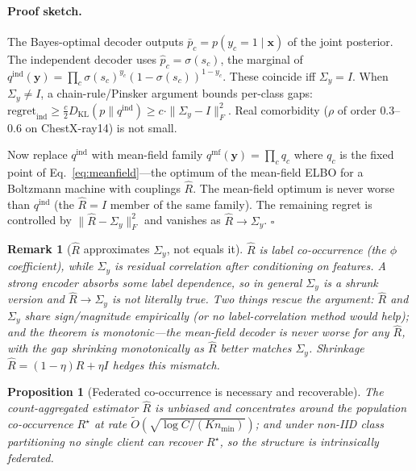\documentclass[10pt,twocolumn,letterpaper]{article}
\newtheorem{proposition}{Proposition}
\newtheorem{remark}{Remark}
\theoremstyle{definition}
\newcommand{\Rhat}{\widehat{R}}
\newcommand{\Sigmay}{\Sigma_{y}}
\begin{document}
\paragraph{Proof sketch.} The Bayes-optimal decoder outputs $\bar p_c{=}p(y_c{=}1{\mid}\mathbf{x})$ of the joint posterior. The independent decoder uses $\hat p_c{=}\sigma(s_c)$, the marginal of $q^{\mathrm{ind}}(\mathbf{y}){=}\prod_c\sigma(s_c)^{y_c}(1{-}\sigma(s_c))^{1-y_c}$. These coincide iff $\Sigmay{=}I$. When $\Sigmay{\neq}I$, a chain-rule/Pinsker argument bounds per-class gaps: $\mathrm{regret}_{\mathrm{ind}}{\geq}\frac{c}{2}D_{\mathrm{KL}}(p\|q^{\mathrm{ind}}){\geq}c{\cdot}\|\Sigmay{-}I\|_F^{2}$. Real comorbidity ($\rho$ of order $0.3$--$0.6$ on ChestX-ray14) is not small.

Now replace $q^{\mathrm{ind}}$ with mean-field family $q^{\mathrm{mf}}(\mathbf{y}){=}\prod_c q_c$ where $q_c$ is the fixed point of Eq.~\eqref{eq:meanfield}---the optimum of the mean-field ELBO for a Boltzmann machine with couplings $\Rhat$. The mean-field optimum is never worse than $q^{\mathrm{ind}}$ (the $\Rhat{=}I$ member of the same family). The remaining regret is controlled by $\|\Rhat{-}\Sigmay\|_F^{2}$ and vanishes as $\Rhat{\to}\Sigmay$. $\square$

\begin{remark}[$\Rhat$ approximates $\Sigmay$, not equals it]
$\Rhat$ is label co-occurrence (the $\phi$ coefficient), while $\Sigmay$ is residual correlation after conditioning on features. A strong encoder absorbs some label dependence, so in general $\Sigmay$ is a shrunk version and $\Rhat{\to}\Sigmay$ is not literally true. Two things rescue the argument: $\Rhat$ and $\Sigmay$ share sign/magnitude empirically (or no label-correlation method would help); and the theorem is monotonic---the mean-field decoder is never worse for \emph{any} $\Rhat$, with the gap shrinking monotonically as $\Rhat$ better matches $\Sigmay$. Shrinkage $\Rhat{=}(1{-}\eta)R{+}\eta I$ hedges this mismatch.
\end{remark}

\begin{proposition}[Federated co-occurrence is necessary and recoverable]
\label{prop:estimation}
The count-aggregated estimator $\Rhat$ is unbiased and concentrates around the population co-occurrence $R^{\star}$ at rate $\tilde O(\sqrt{\log C/(K n_{\min})})$; and under non-IID class partitioning no single client can recover $R^{\star}$, so the structure is intrinsically federated.
\end{proposition}
\end{document}
